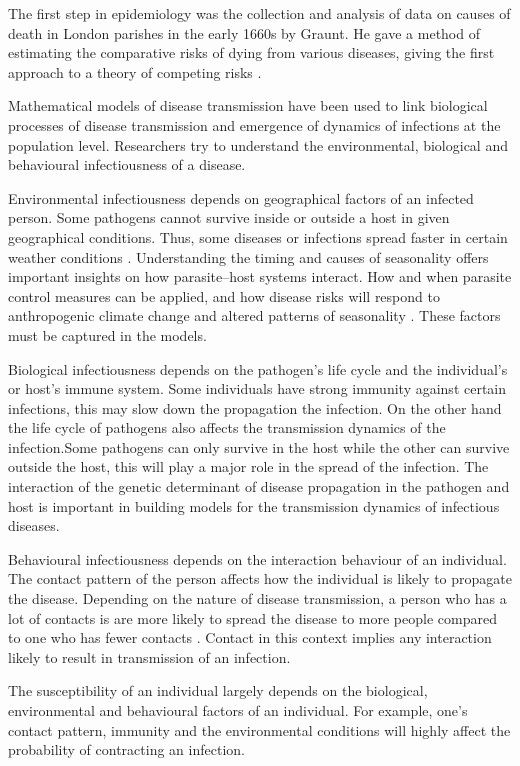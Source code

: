The first step in epidemiology was the collection and analysis of data on causes of death in London parishes in the early 1660s by Graunt.
He  gave a method of estimating the comparative risks of dying from various diseases, giving the first approach to a theory of competing risks \citep{Brauer2017}.
 
Mathematical models of disease transmission have been used to link biological processes of disease transmission and emergence of dynamics of infections at the population level. Researchers try to understand the environmental, biological and behavioural infectiousness of a disease.

 Environmental infectiousness depends on geographical factors of an infected person. Some pathogens cannot survive inside or outside a host in given geographical  conditions. Thus, some diseases or infections spread faster in certain weather conditions \citep{grass}.
Understanding the timing and causes of seasonality offers important insights on how parasite–host systems interact. How and when parasite control measures can be applied, and how disease risks will respond to anthropogenic climate change and altered patterns of seasonality \citep{altizer}. These factors must be captured in the models.

Biological infectiousness depends on the pathogen's life cycle and the individual's or host's immune system. Some individuals have strong immunity against certain infections, this may slow down the propagation the infection. On the other hand the life cycle of pathogens also affects the transmission dynamics of the infection.Some pathogens can only survive in the host while the other can survive outside the host, this will play a major role in the spread of the infection. The interaction of the genetic determinant of disease propagation in the pathogen and host is important in building models for the transmission dynamics of infectious diseases.

Behavioural infectiousness depends on the interaction behaviour of an individual. The contact pattern of the person affects how the individual is likely to propagate the disease. Depending on the nature of disease transmission, a person who has a lot of contacts is are more likely to spread the disease to more people compared to one who has fewer contacts \citep{johnson2001sexual}. Contact in this context implies any interaction likely to result in transmission of an infection.

The susceptibility of an individual largely depends on the biological, environmental and behavioural factors of an individual. For example, one's contact pattern, immunity and the environmental conditions will highly affect the probability of contracting an infection.

